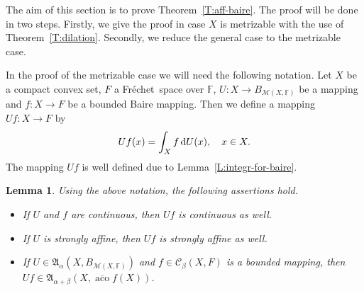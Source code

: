 \documentclass{amsart}
\numberwithin{equation}{section}
\newtheorem{lemma}[thm]{Lemma}
\theoremstyle{definition}
\def\fra{\mathfrak{A}}
\def\C{\mathcal C}
\def\M{\mathcal M}
\def\aco{\operatorname{aco}}
\def\ef{\mathbb F}
\def\ov{\overline}
\def\di{\,\mbox{\rm d}}
\newcommand{\fr}{Fr\'echet\ }
\begin{document}
The aim of this section is to prove Theorem~\ref{T:aff-baire}. The proof will be done in two steps. Firstly, we give the proof in case $X$ is metrizable
with the use of Theorem~\ref{T:dilation}. Secondly, we reduce the general case to the metrizable case.

In the proof of the metrizable case we will need the following notation.
Let $X$ be a compact convex set, $F$ a \fr space over $\ef$, $U:X\to B_{\M(X,\ef)}$ be a mapping and $f:X\to F$ be
a bounded Baire mapping. Then we define a mapping $Uf:X\to F$ by
$$Uf(x)=\int_X f\di U(x),\quad x\in X.$$
The mapping $Uf$ is well defined due to Lemma~\ref{L:integr-for-baire}.

\begin{lemma}\label{L:fra-0} Using the above notation, the following assertions hold.
\begin{itemize}
	\item[(i)] If $U$ and $f$ are continuous, then $Uf$ is continuous as well.
	\item[(ii)] If $U$ is strongly affine, then $Uf$ is strongly affine as well.
	\item[(iii)] If $U\in\fra_\alpha(X,B_{\M(X,\ef)})$ and $f\in\C_\beta(X,F)$ is a bounded mapping, then $Uf\in \fra_{\alpha+\beta}(X,\ov{\aco} f(X))$.
\end{itemize}
 \end{lemma}
\end{document}
